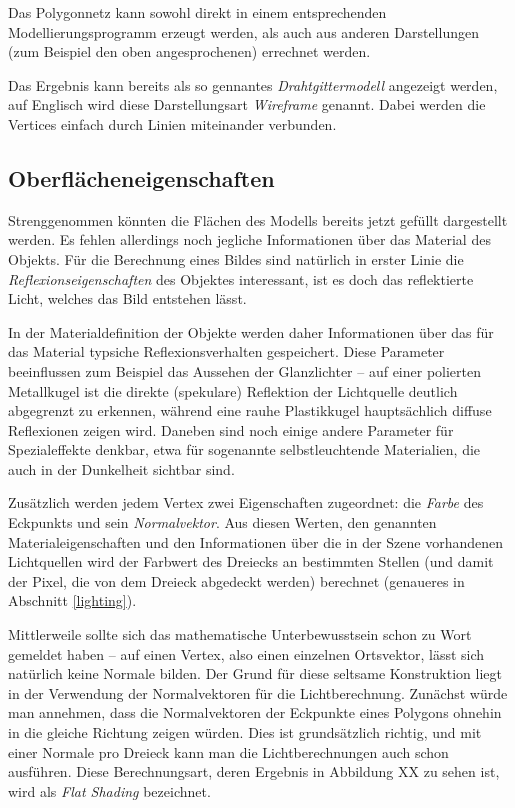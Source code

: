 Das Polygonnetz kann sowohl direkt in einem entsprechenden Modellierungsprogramm erzeugt werden, als auch aus anderen Darstellungen (zum Beispiel den oben angesprochenen) errechnet werden.

Das Ergebnis kann bereits als so gennantes \emph{Drahtgittermodell} angezeigt werden, auf Englisch wird diese Darstellungsart \emph{Wireframe} genannt. Dabei werden die Vertices einfach durch Linien miteinander verbunden.


\subsection{Oberflächeneigenschaften}
Strenggenommen könnten die Flächen des Modells bereits jetzt gefüllt dargestellt werden. Es fehlen allerdings noch jegliche Informationen über das Material des Objekts. Für die Berechnung eines Bildes sind natürlich in erster Linie die \emph{Reflexionseigenschaften} des Objektes interessant, ist es doch das reflektierte Licht, welches das Bild entstehen lässt.

In der Materialdefinition der Objekte werden daher Informationen über das für das Material typsiche Reflexionsverhalten gespeichert. Diese Parameter beeinflussen zum Beispiel das Aussehen der Glanzlichter -- auf einer polierten Metallkugel ist die direkte (spekulare) Reflektion der Lichtquelle deutlich abgegrenzt zu erkennen, während eine rauhe Plastikkugel hauptsächlich diffuse Reflexionen zeigen wird. Daneben sind noch einige andere Parameter für Spezialeffekte denkbar, etwa für sogenannte selbstleuchtende Materialien, die auch in der Dunkelheit sichtbar sind.

Zusätzlich werden jedem Vertex zwei Eigenschaften zugeordnet: die \emph{Farbe} des Eckpunkts und sein \emph{Normalvektor}. Aus diesen Werten, den genannten Materialeigenschaften und den Informationen über die in der Szene vorhandenen Lichtquellen wird der Farbwert des Dreiecks an bestimmten Stellen (und damit der Pixel, die von dem Dreieck abgedeckt werden) berechnet (genaueres in Abschnitt \ref{lighting}).

Mittlerweile sollte sich das mathematische Unterbewusstsein schon zu Wort gemeldet haben -- auf einen Vertex, also einen 
einzelnen Ortsvektor, lässt sich natürlich keine Normale bilden. Der Grund für diese seltsame Konstruktion liegt in der Verwendung der Normalvektoren für die Lichtberechnung. Zunächst würde man annehmen, dass die Normalvektoren der Eckpunkte eines Polygons ohnehin in die gleiche Richtung zeigen würden. Dies ist grundsätzlich richtig, und mit einer Normale pro Dreieck kann man die Lichtberechnungen auch schon ausführen. Diese Berechnungsart, deren Ergebnis in Abbildung XX zu sehen ist, wird als \emph{Flat Shading} bezeichnet.

